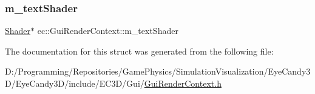 \mbox{\label{structec_1_1_gui_render_context_aa42aa86b9e3f12b973329494a3c89f90}} 
\subsubsection{\texorpdfstring{m\+\_\+text\+Shader}{m\_textShader}}
{\footnotesize\ttfamily \mbox{\hyperlink{classec_1_1_shader}{Shader}}$\ast$ ec\+::\+Gui\+Render\+Context\+::m\+\_\+text\+Shader}



The documentation for this struct was generated from the following file\+:\begin{DoxyCompactItemize}
\item 
D\+:/\+Programming/\+Repositories/\+Game\+Physics/\+Simulation\+Visualization/\+Eye\+Candy3\+D/\+Eye\+Candy3\+D/include/\+E\+C3\+D/\+Gui/\mbox{\hyperlink{_gui_render_context_8h}{Gui\+Render\+Context.\+h}}\end{DoxyCompactItemize}
